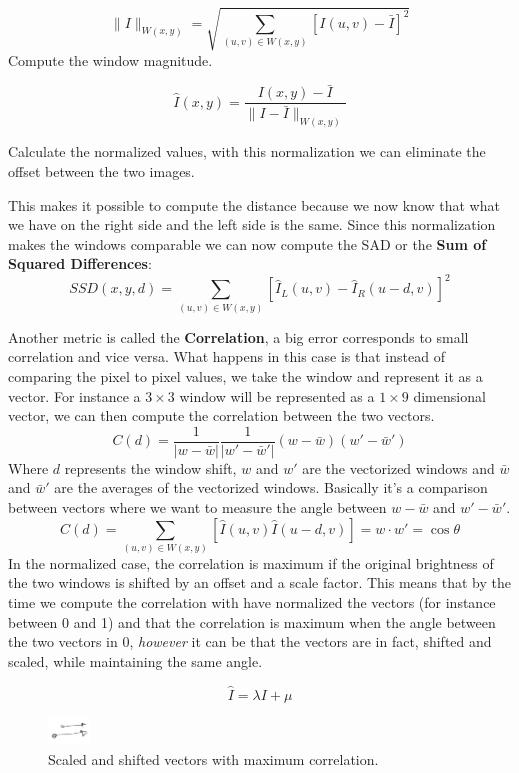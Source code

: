 \begin{multicols}{2}
\[
\| I \|_{W(x,y)} = \sqrt{\sum_{(u,v) \in W(x,y)} [I(u,v) - \bar{I}]^2}
\]
Compute the window magnitude.
\end{multicols}

\begin{multicols}{2}
\[
\hat{I}(x,y) = \frac{I(x,y) - \bar{I}}{\| I - \bar{I} \|_{W(x,y)}}
\]

Calculate the normalized values, with this normalization we can eliminate the offset between the two images.
\end{multicols}

This makes it possible to compute the distance because we now know that what we have on the right side and the left side is the same. Since this normalization makes the windows comparable we can now compute the SAD or the \textbf{Sum of Squared Differences}:
\[
SSD(x,y,d) = \sum_{(u,v) \in W(x,y)} [\hat{I}_L(u,v) - \hat{I}_R(u-d,v)]^2
\]

Another metric is called the \textbf{Correlation}, a big error corresponds to small correlation and vice versa. What happens in this case is that instead of comparing the pixel to pixel values, we take the window and represent it as a vector. For instance a \(3\times 3\) window will be represented as a \(1\times9\) dimensional vector, we can then compute the correlation between the two vectors.
\[
C(d) = \frac{1}{|w-\bar{w}|}\frac{1}{|w'- \bar{w}'|}(w-\bar{w})(w'-\bar{w}')
\]
Where \(d\) represents the window shift, \(w\) and \(w'\) are the vectorized windows and \(\bar{w}\) and \(\bar{w}'\) are the averages of the vectorized windows. Basically it's a comparison between vectors where we want to measure the angle between \(w - \bar{w}\) and \(w' - \bar{w}'\).
\[
C(d) = \sum_{(u,v) \in W(x,y)} [\hat{I}(u,v) \hat{I}(u-d,v)] = w\cdot w' = \cos\theta    
\]
In the normalized case, the correlation is maximum if the original brightness of the two windows is shifted by an offset and a scale factor. This means that by the time we compute the correlation with have normalized the vectors (for instance between 0 and 1) and that the correlation is maximum when the angle between the two vectors in 0, \textit{however} it can be that the vectors are in fact, shifted and scaled, while maintaining the same angle. 

\begin{multicols}{2}
\[
\hat{I} = \lambda I + \mu
\]
\begin{figure}[H]
    \centering
    \includegraphics[width=0.1\textwidth]{Figures/vectors.png}
    \caption{Scaled and shifted vectors with maximum correlation.}
    \label{fig:vectors}
\end{figure}
\end{multicols}

